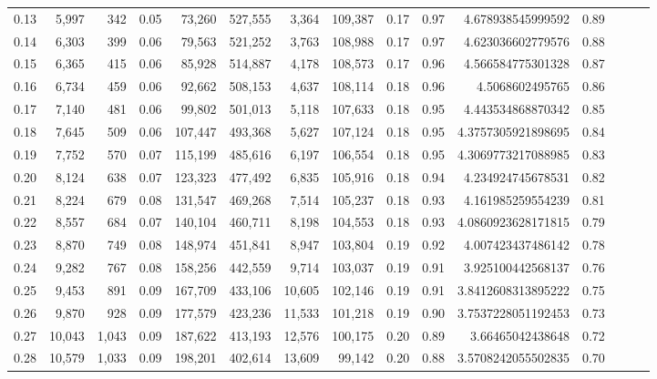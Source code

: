 \begin{tabular}{rrrrrrrrrrrrrrr}
0.13 &   5,997 &    342 &  0.05 &   73,260 &  527,555 &    3,364 &  109,387 &  0.17 &  0.97 &     4.678938545999592 &      0.89 \\
0.14 &   6,303 &    399 &  0.06 &   79,563 &  521,252 &    3,763 &  108,988 &  0.17 &  0.97 &     4.623036602779576 &      0.88 \\
0.15 &   6,365 &    415 &  0.06 &   85,928 &  514,887 &    4,178 &  108,573 &  0.17 &  0.96 &     4.566584775301328 &      0.87 \\
0.16 &   6,734 &    459 &  0.06 &   92,662 &  508,153 &    4,637 &  108,114 &  0.18 &  0.96 &       4.5068602495765 &      0.86 \\
0.17 &   7,140 &    481 &  0.06 &   99,802 &  501,013 &    5,118 &  107,633 &  0.18 &  0.95 &     4.443534868870342 &      0.85 \\
0.18 &   7,645 &    509 &  0.06 &  107,447 &  493,368 &    5,627 &  107,124 &  0.18 &  0.95 &    4.3757305921898695 &      0.84 \\
0.19 &   7,752 &    570 &  0.07 &  115,199 &  485,616 &    6,197 &  106,554 &  0.18 &  0.95 &    4.3069773217088985 &      0.83 \\
0.20 &   8,124 &    638 &  0.07 &  123,323 &  477,492 &    6,835 &  105,916 &  0.18 &  0.94 &     4.234924745678531 &      0.82 \\
0.21 &   8,224 &    679 &  0.08 &  131,547 &  469,268 &    7,514 &  105,237 &  0.18 &  0.93 &     4.161985259554239 &      0.81 \\
0.22 &   8,557 &    684 &  0.07 &  140,104 &  460,711 &    8,198 &  104,553 &  0.18 &  0.93 &    4.0860923628171815 &      0.79 \\
0.23 &   8,870 &    749 &  0.08 &  148,974 &  451,841 &    8,947 &  103,804 &  0.19 &  0.92 &     4.007423437486142 &      0.78 \\
0.24 &   9,282 &    767 &  0.08 &  158,256 &  442,559 &    9,714 &  103,037 &  0.19 &  0.91 &     3.925100442568137 &      0.76 \\
0.25 &   9,453 &    891 &  0.09 &  167,709 &  433,106 &   10,605 &  102,146 &  0.19 &  0.91 &    3.8412608313895222 &      0.75 \\
0.26 &   9,870 &    928 &  0.09 &  177,579 &  423,236 &   11,533 &  101,218 &  0.19 &  0.90 &    3.7537228051192453 &      0.73 \\
0.27 &  10,043 &  1,043 &  0.09 &  187,622 &  413,193 &   12,576 &  100,175 &  0.20 &  0.89 &      3.66465042438648 &      0.72 \\
0.28 &  10,579 &  1,033 &  0.09 &  198,201 &  402,614 &   13,609 &   99,142 &  0.20 &  0.88 &    3.5708242055502835 &      0.70 \\

\end{tabular}
